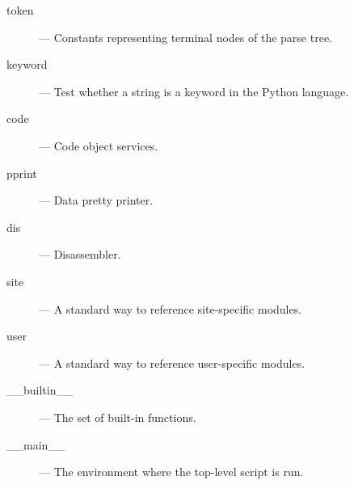 \begin{description}
\item[token]
--- Constants representing terminal nodes of the parse tree.

\item[keyword]
--- Test whether a string is a keyword in the Python language.

\item[code]
--- Code object services.

\item[pprint]
--- Data pretty printer.

\item[dis]
--- Disassembler.

\item[site]
--- A standard way to reference site-specific modules.

\item[user]
--- A standard way to reference user-specific modules.

\item[__builtin__]
--- The set of built-in functions.

\item[__main__]
--- The environment where the top-level script is run.

\end{description}
